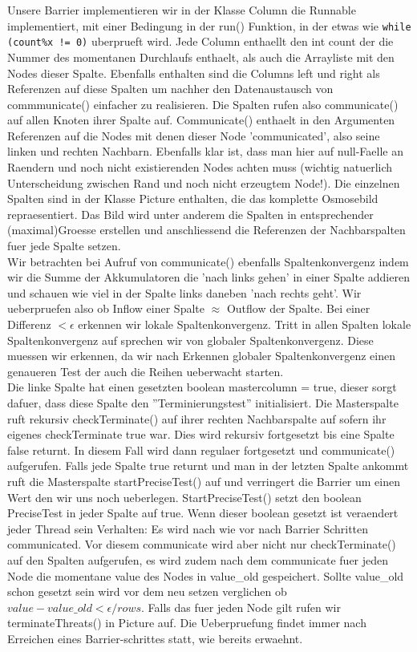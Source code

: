 \documentclass[12pt]{article}
\begin{document}
Unsere Barrier implementieren wir in der Klasse Column die Runnable implementiert, mit einer Bedingung in der run() Funktion, in der etwas wie \verb+while (count%x != 0)+ uberprueft wird. Jede Column enthaellt den int count der die Nummer des momentanen Durchlaufs enthaelt, als auch die Arrayliste mit den Nodes dieser Spalte. Ebenfalls enthalten sind die Columns left und right als Referenzen auf diese Spalten um nachher den Datenaustausch von commmunicate() einfacher zu realisieren. Die Spalten rufen also communicate() auf allen Knoten ihrer Spalte auf. Communicate() enthaelt in den Argumenten Referenzen auf die Nodes mit denen dieser Node 'communicated', also seine linken und rechten Nachbarn. Ebenfalls klar ist, dass man hier auf null-Faelle an Raendern und noch nicht existierenden Nodes achten muss (wichtig natuerlich Unterscheidung zwischen Rand und noch nicht erzeugtem Node!). Die einzelnen Spalten sind in der Klasse Picture enthalten, die das komplette Osmosebild repraesentiert. Das Bild wird unter anderem die Spalten in entsprechender (maximal)Groesse erstellen und anschliessend die Referenzen der Nachbarspalten fuer jede Spalte setzen.\\
Wir betrachten bei Aufruf von communicate() ebenfalls Spaltenkonvergenz indem wir die Summe der Akkumulatoren die 'nach links gehen' in einer Spalte addieren und schauen wie viel in der Spalte links daneben 'nach rechts geht'. Wir ueberpruefen also ob Inflow einer Spalte $\approx$ Outflow der Spalte. Bei einer Differenz $< \epsilon$ erkennen wir lokale Spaltenkonvergenz. Tritt in allen Spalten lokale Spaltenkonvergenz auf sprechen wir von globaler Spaltenkonvergenz. Diese muessen wir erkennen, da wir nach Erkennen globaler Spaltenkonvergenz einen genaueren Test der auch die Reihen ueberwacht starten. \\
Die linke Spalte hat einen gesetzten boolean mastercolumn = true, dieser sorgt dafuer, dass diese Spalte den ''Terminierungstest'' initialisiert. Die Masterspalte ruft rekursiv checkTerminate() auf ihrer rechten Nachbarspalte auf sofern ihr eigenes checkTerminate true war. Dies wird rekursiv fortgesetzt bis eine Spalte false returnt. In diesem Fall wird dann regulaer fortgesetzt und communicate() aufgerufen. Falls jede Spalte true returnt und man in der letzten Spalte ankommt ruft die Masterspalte startPreciseTest() auf und verringert die Barrier um einen Wert den wir uns noch ueberlegen. StartPreciseTest() setzt den boolean PreciseTest in jeder Spalte auf true. Wenn dieser boolean gesetzt ist veraendert jeder Thread sein Verhalten: Es wird nach wie vor nach Barrier Schritten communicated. Vor diesem communicate wird aber nicht nur checkTerminate() auf den Spalten aufgerufen, es wird zudem nach dem communicate fuer jeden Node die momentane value des Nodes in value\_old gespeichert. Sollte value\_old schon gesetzt sein wird vor dem neu setzen verglichen ob $value-value\_old < \epsilon/rows$. Falls das fuer jeden Node gilt rufen wir terminateThreats() in Picture auf. Die Ueberpruefung findet immer nach Erreichen eines Barrier-schrittes statt, wie bereits erwaehnt.\\
\end{document}
